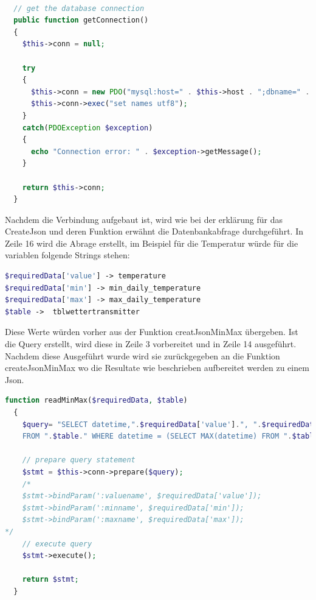 \begin{lstlisting}[label=lst:database,caption=Beispiel Aufbau der Datenbankverbindung, language=php, style=php]

  // get the database connection
  public function getConnection()
  {
    $this->conn = null;

    try
    {
      $this->conn = new PDO("mysql:host=" . $this->host . ";dbname=" . $this->db_name, $this->username, $this->password);
      $this->conn->exec("set names utf8");
    }
    catch(PDOException $exception)
    {
      echo "Connection error: " . $exception->getMessage();
    }

    return $this->conn;
  }


\end{lstlisting}
Nachdem die Verbindung aufgebaut ist, wird wie bei der erklärung für das CreateJson und deren Funktion erwähnt die Datenbankabfrage durchgeführt. In Zeile 16 wird die Abrage erstellt, im Beispiel für die Temperatur würde für die variablen folgende Strings stehen:\\
\begin{lstlisting}[label=lst:createJson,caption=Beispiel erstellung des Jsons, language=php, style=php]
$requiredData['value'] -> temperature
$requiredData['min'] -> min_daily_temperature
$requiredData['max'] -> max_daily_temperature
$table ->  tblwettertransmitter
\end{lstlisting}
Diese Werte würden vorher aus der Funktion creatJsonMinMax übergeben. Ist die Query erstellt, wird diese in Zeile 3 vorbereitet und in Zeile 14 ausgeführt. Nachdem diese Ausgeführt wurde wird sie zurückgegeben an die Funktion createJsonMinMax wo die Resultate wie beschrieben aufbereitet werden zu einem Json.

\begin{lstlisting}[label=lst:createJson,caption=Beispiel erstellung des Jsons, language=php, style=php]
function readMinMax($requiredData, $table)
  {
    $query= "SELECT datetime,".$requiredData['value'].", ".$requiredData['min'].", ".$requiredData['max']."
    FROM ".$table." WHERE datetime = (SELECT MAX(datetime) FROM ".$table.");";

    // prepare query statement
    $stmt = $this->conn->prepare($query);
    /*
    $stmt->bindParam(':valuename', $requiredData['value']);
    $stmt->bindParam(':minname', $requiredData['min']);
    $stmt->bindParam(':maxname', $requiredData['max']);
*/
    // execute query
    $stmt->execute();

    return $stmt;
  }



\end{lstlisting}

